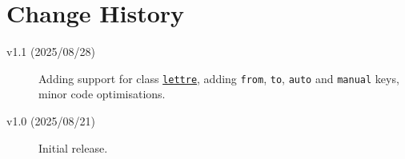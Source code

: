 \documentclass{article}
\begin{document}
	\section{Change History}
		\begin{description}
			\item[v1.1 \textnormal{(2025/08/28)}] Adding support for class \href{https://ctan.org/pkg/lettre}{\texttt{lettre}}, adding \verb|from|, \verb|to|, \verb|auto| and \verb|manual| keys, minor code optimisations.

			\item[v1.0 \textnormal{(2025/08/21)}] Initial release.
		\end{description}
\end{document}
